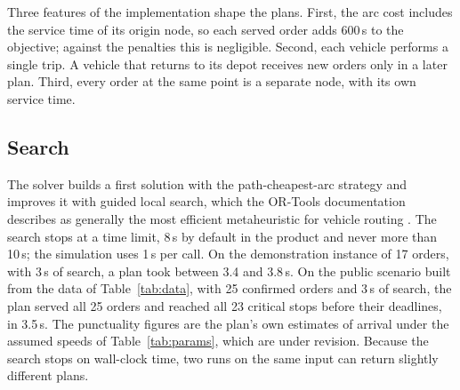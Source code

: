 \documentclass[11pt]{article}
\begin{document}
Three features of the implementation shape the plans. %
First, the arc cost includes the service time of its origin node, so each served order adds 600\,s to the objective; against the penalties this is negligible. Second, each vehicle performs a single trip. A vehicle that returns to its depot receives new orders only in a later plan. Third, every order at the same point is a separate node, with its own service time.

\subsection{Search}

The solver builds a first solution with the path-cheapest-arc strategy and improves it with guided local search, which the OR-Tools documentation describes as generally the most efficient metaheuristic for vehicle routing \citep{ortools_routing_options}. The search stops at a time limit, 8\,s by default in the product and never more than 10\,s; the simulation uses 1\,s per call. On the demonstration instance of 17 orders, with 3\,s of search, a plan took between 3.4 and 3.8\,s. On the public scenario built from the data of Table~\ref{tab:data}, with 25 confirmed orders and 3\,s of search, the plan served all 25 orders and reached all 23 critical stops before their deadlines, in 3.5\,s. The punctuality figures are the plan's own estimates of arrival under the assumed speeds of Table~\ref{tab:params}, which are under revision. Because the search stops on wall-clock time, two runs on the same input can return slightly different plans.
\end{document}
